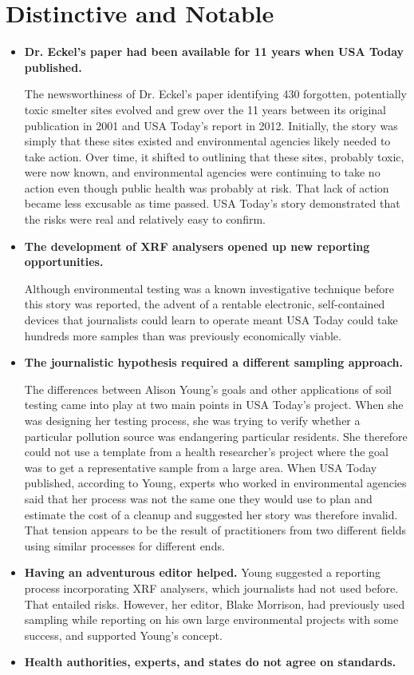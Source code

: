 \section{Distinctive and Notable}
\begin{itemize}
\item \textbf{Dr. Eckel's paper had been available for 11 years when
USA Today published.}

The newsworthiness of Dr. Eckel's paper identifying 430 forgotten,
potentially toxic smelter sites evolved and grew over the 11 years
between its original publication in 2001 and USA Today's report in
2012. Initially, the story was simply that these sites existed and environmental
agencies likely needed to take action. Over time, it shifted
to outlining that these sites, probably toxic, were now known, and
environmental agencies were continuing to take no action even
though public health was probably at risk. That lack of action became
less excusable as time passed. USA Today's story demonstrated that
the risks were real and relatively easy to confirm.
\item \textbf{The development of XRF analysers opened up new
reporting opportunities.}

Although environmental testing was a known investigative technique
before this story was reported, the advent of a rentable electronic,
self-contained devices that journalists could learn to operate meant
USA Today could take hundreds more samples than was previously
economically viable.
\item \textbf{The journalistic hypothesis required a different
sampling approach.}

The differences between Alison Young's goals and other applications
of soil testing came into play at two main points in USA Today's project.
When she was designing her testing process, she was trying to
verify whether a particular pollution source was endangering particular
residents. She therefore could not use a template from a health
researcher's project where the goal was to get a representative sample
from a large area. When USA Today published, according to Young,
experts who worked in environmental agencies said that her process
was not the same one they would use to plan and estimate the cost of
a cleanup and suggested her story was therefore invalid. That tension
appears to be the result of practitioners from two different fields using
similar processes for different ends.

\item \textbf{Having an adventurous editor helped.}
Young suggested a reporting process incorporating XRF analysers,
which journalists had not used before. That entailed risks. However,
her editor, Blake Morrison, had previously used sampling while
reporting on his own large environmental projects with some success,
and supported Young's concept.
\item \textbf{Health authorities, experts, and states do not agree
on standards.}


\end{itemize}
